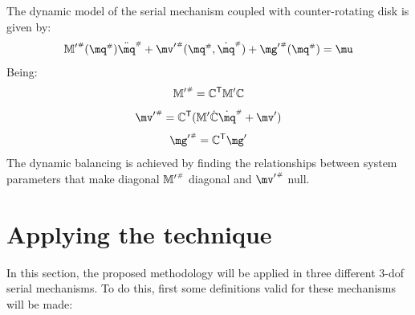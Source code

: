 \documentclass[a4paper,11pt,brazil,fleqn]{article}
\begin{document}
The dynamic model of the serial mechanism coupled with counter-rotating disk is given by:
\begin{equation}\label{eq:CoupledDynamics}
{\mM'}\ssh (\mq\ssh) \ddot{\mq}\ssh + {\mv'}\ssh(\mq\ssh,\dot{\mq}\ssh) + {\mg'}\ssh (\mq\ssh) = \mu
\end{equation}
Being:
\begin{equation}\label{eq:Mh'}
{\mathbb{M}'}^{\scriptscriptstyle \#} = \mathbb{C}^{\mathsf{T}} \mathbb{M}' \mathbb{C}
\end{equation}
\begin{equation}\label{eq:vh'}
{\mv'}\ssh = \mC^\msT ( \mM' \dot{\mC} \dot{\mq}\ssh + \mv')
\end{equation}
\begin{equation}\label{eq:gh'}
{\mg'}\ssh = \mC^\msT \mg'
\end{equation}
The dynamic balancing is achieved by finding the relationships between system parameters that make diagonal ${\mathbb{M}'}^{\scriptscriptstyle \#}$ diagonal and ${\mv'}\ssh$ null.


 

\section{Applying the technique}\label{S03}

In this section, the proposed methodology will be applied in three different 3-dof serial mechanisms. To do this, first some definitions valid for these mechanisms will be made:
\end{document}
